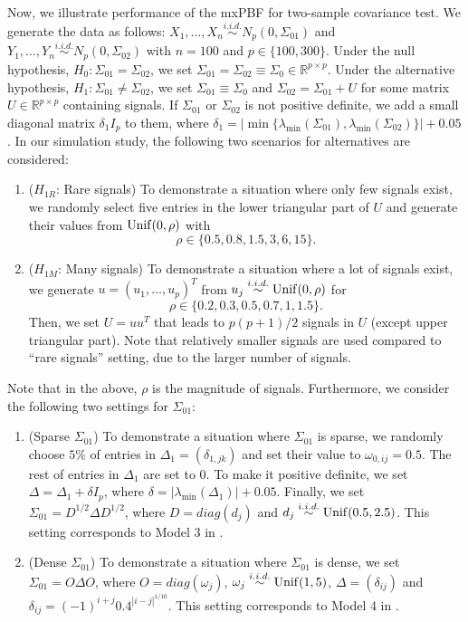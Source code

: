 \documentclass[11pt]{article}
\newcommand{\sg}{\Sigma}
\newcommand{\bbR}{\mathbb{R}}
\begin{document}
Now, we illustrate performance of the mxPBF for two-sample covariance test.
We generate the data as follows: $X_1,\ldots, X_{n} \overset{i.i.d.}{\sim} N_p( 0,  \sg_{01})$ and $Y_1,\ldots, Y_{n} \overset{i.i.d.}{\sim} N_p( 0 , \sg_{02})$ with $n = 100$ and $p \in \{100, 300\}$.
Under the null hypothesis, $H_0: \sg_{01} = \sg_{02}$, we set $\sg_{01} = \sg_{02} \equiv \sg_0\in \bbR^{p \times p}$.
Under the alternative hypothesis, $H_1: \sg_{01}\neq \sg_{02}$, we set $\sg_{01} \equiv \sg_0 $ and $\sg_{02} = \sg_{01} + U$ for some matrix $U \in \bbR^{p\times p}$ containing signals.
If $\sg_{01}$ or $\sg_{02}$ is not positive definite, we add a small diagonal matrix $\delta_1 I_p$ to them, where $\delta_1 = | \min  \{\lambda_{\min}(\sg_{01}), \lambda_{\min}(\sg_{02})\} | + 0.05$.
In our simulation study, the following two scenarios for alternatives are considered:
\begin{enumerate}
	\item ($H_{1R}$: Rare signals) 
	To demonstrate a situation where only few signals exist, 
	we randomly select five entries in the lower triangular part of $U$ and generate their values from ${\rm Unif}(0, \rho)$ with 
	\begin{equation*}
		\rho \in \{ 0.5, 0.8, 1.5, 3, 6, 15 \}.
	\end{equation*}
	
	\item ($H_{1M}$: Many signals) 
	To demonstrate a situation where a lot of signals exist, 
	we generate $u = (u_1,\ldots, u_p)^T$ from $u_j \overset{i.i.d.}{\sim} {\rm Unif}(0, \rho)$ for 
	\begin{equation*}
		\rho \in \{ 0.2, 0.3, 0.5, 0.7, 1, 1.5 \}.
	\end{equation*}
	Then, we set $U = u u^T$ that leads to $p(p+1)/2$ signals in $U$ (except upper triangular part).
	Note that relatively smaller signals are used compared to ``rare signals'' setting, due to the larger number of signals.
\end{enumerate}
Note that in the above, $\rho$ is the magnitude of signals.
Furthermore, we consider the following two settings for $\sg_{01}$: 
\begin{enumerate}
	\item (Sparse $\sg_{01}$) 
	To demonstrate a situation where $\sg_{01}$ is sparse, 
	we randomly choose $5\%$ of entries in $\Delta_1 = (\delta_{1,jk})$ and set their value to $\omega_{0, ij} = 0.5$.
	The rest of entries in $\Delta_1$ are set to $0$. 
	To make it positive definite, we set $\Delta = \Delta_1 + \delta I_p$, where $\delta = | \lambda_{\min}(\Delta_1)| + 0.05$.
	Finally, we set $\sg_{01} =  D^{1/2} \Delta D^{1/2}$, where $D= diag(d_j)$ and $d_j \overset{i.i.d.}{\sim} {\rm Unif}(0.5, 2.5)$.
	This setting corresponds to Model 3 in \cite{cai2013two}.
	
	\item (Dense $\sg_{01}$) 
	To demonstrate a situation where $\sg_{01}$ is dense, we set $\sg_{01}  = O \Delta O$, where $O = diag(\omega_j)$, $\omega_j \overset{i.i.d.}{\sim} {\rm Unif}(1,5)$, $\Delta = (\delta_{ij})$ and $\delta_{ij} = (-1)^{i+j} 0.4^{|i-j|^{1/10}}$.
	This setting corresponds to Model 4 in \cite{cai2013two}.
\end{enumerate}
\end{document}
